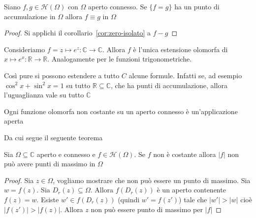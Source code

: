 \begin{corollary}\label{cor:estensione-analitica}
    Siano \(f, g \in \mathcal{H}{(\Omega)}\) con \(\Omega\) aperto connesso. Se
    \( \{ f = g\} \) ha un punto di accumulazione in \(\Omega\) allora \(f
    \equiv g\) in \(\Omega\) 
\end{corollary}
\begin{proof}
    Si applichi il corollario~\ref{cor:zero-isolato} a \(f-g\)
\end{proof}
\begin{example}
    Consideriamo \(f = z \mapsto e^{z} : \mathbb{C}\to \mathbb{C}\). Allora
    \(f\) è l'unica estensione olomorfa di \(x \mapsto e^{x} : \mathbb{R} \to
    \mathbb{R}\). Analogamente per le funzioni trigonometriche.

    Così pure si possono estendere a tutto \(C\) alcune formule. Infatti se, ad
    esempio \(\cos^2 x + \sin^2 x = 1\) su tutto \(\mathbb{R} \subseteq \mathbb{C} \), che ha punti di
    accumulazione, allora l'uguaglianza vale su tutto \(\mathbb{C}\)
\end{example}

\begin{theorem}\label{thm:olomorfa-aperta}
    Ogni funzione olomorfa non costante su un aperto connesso è un'applicazione aperta
\end{theorem}

Da cui segue il seguente teorema
\begin{theorem}
Sia \(\Omega \subseteq \mathbb{C} \) aperto e connesso e \(f \in
\mathcal{H}{(\Omega)}\). Se \(f\) non è costante allora \(|f|\) non può avere
punti di massimo in \(\Omega\) 
\end{theorem}

\begin{proof}
    Sia \(z \in \Omega\), vogliamo mostrare che non può essere un punto di
    massimo. Sia \(w = f{(z)}\). Sia \(D_r{(z)} \subseteq \Omega \). Allora
    \(f{(D_r{(z)})}\) è un aperto contenente \(f{(z)} = w\).
    Esiste \(w' \in f{(D_r{(z)})}\) (quindi \(w' = f{(z')}\)) tale che \(|w'| >
    |w|\) cioè \(|f{(z')}| > |f{(z)}|\). Allora \(z\) non può essere punto di
    massimo per \(|f|\) 
\end{proof}

